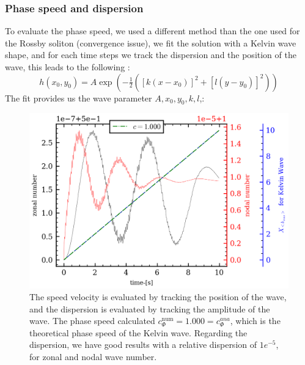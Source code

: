 \documentclass[11pt,a4paper]{report}
\begin{document}
\begin{multicols}{2}
    \subsubsection{Phase speed and dispersion }
    To evaluate the phase speed, we used a different method than the one used for the Rossby soliton (convergence issue), we fit the solution with a Kelvin wave shape, and for each time steps we track the dispersion and the position of the wave, this leads to the following :
    $$  h(x_0,y_0) = A \exp(-\tfrac{1}{2} ([k(x - x_0)] ^2 +[l(y - y_0)]^ 2)) $$
    The fit provides us the wave parameter $A, x_0, y_0, k, l$,:
    \begin{figure}[H]
        \includegraphics[width=1\linewidth]{./figure/kelvin_wave_param.png}
        \caption{The speed velocity is evaluated by tracking the position of the wave, and the dispersion is evaluated by tracking the amplitude of the wave. The phase speed calculated $c_\Phi^{\text{num}} = 1.000 = c_\Phi^{ana}$, which is the theoretical phase speed of the Kelvin wave.
            Regarding the dispersion, we have good results with a relative dispersion of $1e^{-5}$, for zonal and nodal wave number.}
    \end{figure}


\end{multicols}
\end{document}
